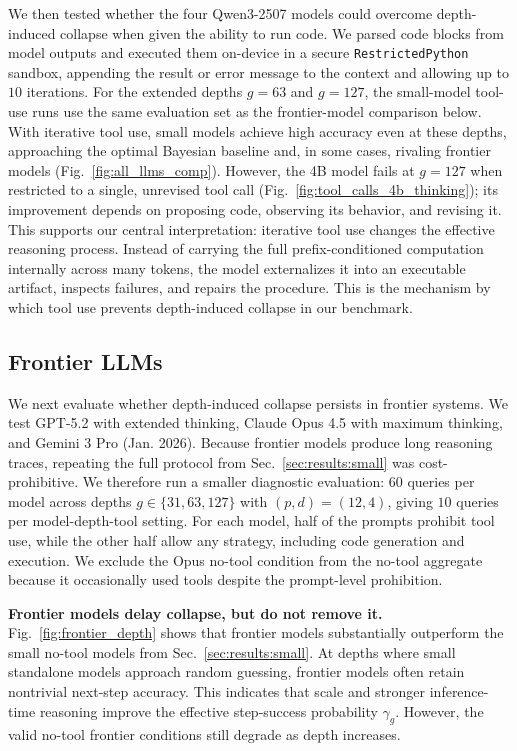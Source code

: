 \documentclass{article}
\begin{document}
We then tested whether the four Qwen3-2507 models could overcome depth-induced collapse when given the ability to run code. We parsed code blocks from model outputs and executed them on-device in a secure \texttt{RestrictedPython} sandbox, appending the result or error message to the context and allowing up to $10$ iterations. For the extended depths $g=63$ and $g=127$, the small-model tool-use runs use the same evaluation set as the frontier-model comparison below. With iterative tool use, small models achieve high accuracy even at these depths, approaching the optimal Bayesian baseline and, in some cases, rivaling frontier models (Fig.~\ref{fig:all_llms_comp}). However, the 4B model fails at $g=127$ when restricted to a single, unrevised tool call (Fig.~\ref{fig:tool_calls_4b_thinking}); its improvement depends on proposing code, observing its behavior, and revising it. This supports our central interpretation: iterative tool use changes the effective reasoning process. Instead of carrying the full prefix-conditioned computation internally across many tokens, the model externalizes it into an executable artifact, inspects failures, and repairs the procedure. This is the mechanism by which tool use prevents depth-induced collapse in our benchmark.





\subsection{Frontier LLMs}\label{sec:results:frontier}
We next evaluate whether depth-induced collapse persists in frontier systems. We test GPT-5.2 with extended thinking, Claude Opus 4.5 with maximum thinking, and Gemini 3 Pro (Jan. 2026). Because frontier models produce long reasoning traces, repeating the full protocol from Sec.~\ref{sec:results:small} was cost-prohibitive. We therefore run a smaller diagnostic evaluation: $60$ queries per model across depths $g\in\{31,63,127\}$ with $(p,d)=(12,4)$, giving $10$ queries per model-depth-tool setting. For each model, half of the prompts prohibit tool use, while the other half allow any strategy, including code generation and execution. We exclude the Opus no-tool condition from the no-tool aggregate because it occasionally used tools despite the prompt-level prohibition.

{\bf Frontier models delay collapse, but do not remove it.\enspace} Fig.~\ref{fig:frontier_depth} shows that frontier models substantially outperform the small no-tool models from Sec.~\ref{sec:results:small}. At depths where small standalone models approach random guessing, frontier models often retain nontrivial next-step accuracy. This indicates that scale and stronger inference-time reasoning improve the effective step-success probability $\gamma_g$. However, the valid no-tool frontier conditions still degrade as depth increases. 
\end{document}
